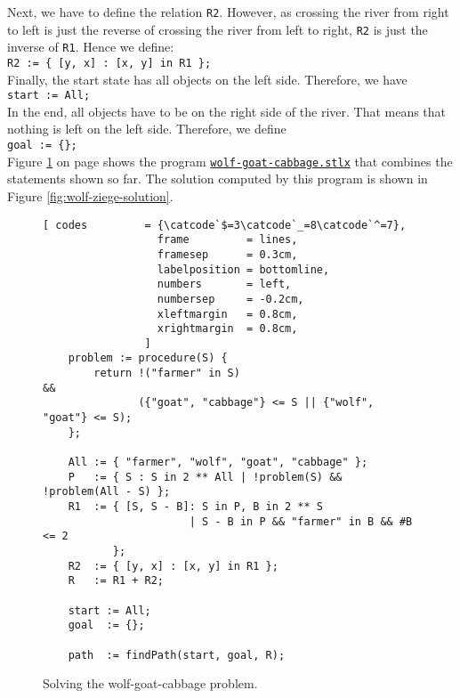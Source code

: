 Next, we have to define the relation \texttt{R2}.  However, as crossing the river from right to left
is just the reverse of crossing the river from left to right, \texttt{R2} is just the inverse of
\texttt{R1}.   Hence we define:
\\[0.2cm]
\hspace*{1.3cm}
\texttt{R2  := \{ [y, x] : [x, y] in R1 \};}
\\[0.2cm]
Finally, the start state has all objects on the left side.  Therefore, we have
\\[0.2cm]
\hspace*{1.3cm}
\texttt{start := All;}
\\[0.2cm]
In the end, all objects have to be on the right side of the river.  That means that nothing is left
on the left side.  Therefore, we define
\\[0.2cm]
\hspace*{1.3cm}
\texttt{goal := \{\};}
\\[0.2cm]
Figure \ref{fig:wolf-ziege} on page \pageref{fig:wolf-ziege} shows the program
\href{https://github.com/karlstroetmann/Logik/blob/master/SetlX/wolf-goat-cabbage.stlx}{\texttt{wolf-goat-cabbage.stlx}}
that combines the statements shown so far.  The solution computed by this program is shown in Figure
 \ref{fig:wolf-ziege-solution}.

\begin{figure}[!ht]
  \centering
\begin{Verbatim}[ codes         = {\catcode`$=3\catcode`_=8\catcode`^=7},
                  frame         = lines, 
                  framesep      = 0.3cm, 
                  labelposition = bottomline,
                  numbers       = left,
                  numbersep     = -0.2cm,
                  xleftmargin   = 0.8cm,
                  xrightmargin  = 0.8cm,
                ]
    problem := procedure(S) {
        return !("farmer" in S)                                     && 
               ({"goat", "cabbage"} <= S || {"wolf", "goat"} <= S);
    };
    
    All := { "farmer", "wolf", "goat", "cabbage" };
    P   := { S : S in 2 ** All | !problem(S) && !problem(All - S) };
    R1  := { [S, S - B]: S in P, B in 2 ** S
                       | S - B in P && "farmer" in B && #B <= 2
           };
    R2  := { [y, x] : [x, y] in R1 };
    R   := R1 + R2;
    
    start := All;
    goal  := {};
    
    path  := findPath(start, goal, R);
\end{Verbatim} 
\vspace*{-0.3cm}
\caption{Solving the wolf-goat-cabbage problem.}  
\label{fig:wolf-ziege}
\end{figure}


